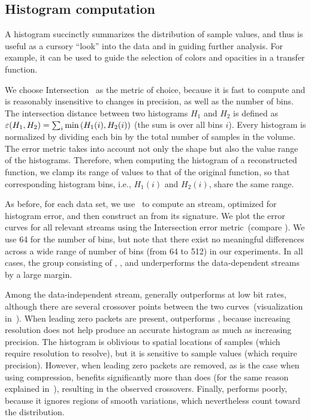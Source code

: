 \subsection{Histogram computation}\label{sec:histogram}

A histogram succinctly summarizes the distribution of sample values, and thus is useful as a cursory ``look''
into the data and in guiding further analysis. For example, it can be used to guide the selection of
colors and opacities in a transfer function.

We choose Intersection~\cite{histogram_intersection1991} as the metric of choice, because it is fast
to compute and is reasonably insensitive to changes in precision, as well as the number of bins. The
intersection distance between two histograms $H_1$ and $H_2$ is defined as
$\err(H_1,H_2)=\sum_{i}{\min{(H_1(i),H_2(i))}}$ (the sum is over all bins $i$). Every histogram is
normalized by dividing each bin by the total number of samples in the volume. The error metric takes
into account not only the shape but also the value range of the histograms. Therefore, when
computing the histogram of a reconstructed function, we clamp its range of values to that of the
original function, so that corresponding histogram bins, i.e., $H_1(i)$ and $H_2(i)$, share the same
range.

As before, for each data set, we use~ to compute an \shop stream, optimized for
histogram error, and then construct an \shsg from its signature. We plot the error curves for all relevant
streams using the Intersection error metric~(compare ). We use
64 for the number of bins, but note that there exist no meaningful differences across a wide range
of number of bins (from 64 to 512) in our experiments. In all cases, the group consisting of
\sbit, \slvl, and \smag underperforms the data-dependent streams by a large margin.

Among the data-independent stream, \slvl generally outperforms \sbit at low bit rates, although there are
several crossover points between the two curves~(visualization in~).
When leading zero packets are present, \slvl outperforms
\sbit, because increasing resolution does not help produce an accurate histogram as much as
increasing precision. The histogram is oblivious to spatial locations of samples (which require
resolution to resolve), but it is sensitive to sample values (which require precision). However,
when leading zero packets are removed, as is the case when using compression, \sbit benefits
significantly more than \slvl does (for the same reason explained in~),
resulting in the observed crossovers. Finally, \smag performs poorly, because it ignores regions
of smooth variations, which nevertheless count toward the distribution.

